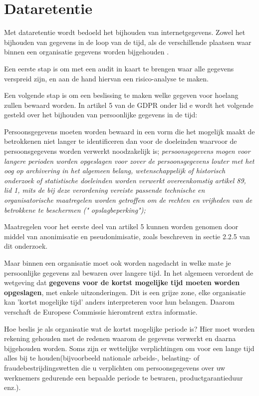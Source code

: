 \section{Dataretentie}
Met dataretentie wordt bedoeld het bijhouden van internetgegevens. Zowel het bijhouden van gegevens in de loop van de tijd, als de verschillende plaatsen waar binnen een organisatie gegevens worden bijgehouden \textcite{Commissie2016}.

Een eerste stap is om met een audit in kaart te brengen waar alle gegevens verspreid zijn, en aan de hand hiervan een risico-analyse te maken. 

Een volgende stap is om een beslissing te maken welke gegeven voor hoelang zullen bewaard worden. 
In artikel 5 van de GDPR onder lid e wordt het volgende gesteld over het bijhouden van persoonlijke gegevens in de tijd:

Persoonsgegevens moeten worden bewaard in een vorm die het mogelijk maakt de betrokkenen niet langer te identificeren dan voor de doeleinden waarvoor de persoonsgegevens worden verwerkt noodzakelijk is; \textit{persoonsgegevens mogen voor langere perioden worden opgeslagen voor zover de persoonsgegevens louter met het oog op archivering in het algemeen belang, wetenschappelijk of historisch onderzoek of statistische doeleinden worden verwerkt overeenkomstig artikel 89, lid 1, mits de bij deze verordening vereiste passende technische en organisatorische maatregelen worden getroffen om de rechten en vrijheden van de betrokkene te beschermen (" opslagbeperking");}

Maatregelen voor het eerste deel van artikel 5 kunnen worden genomen door middel van anonimisatie en pseudonimisatie, zoals beschreven in sectie 2.2.5 van dit onderzoek. 

Maar binnen een organisatie moet ook worden nagedacht in welke mate je persoonlijke gegevens zal bewaren over langere tijd. In het algemeen verordent de wetgeving dat \textbf{gegevens voor de kortst mogelijke tijd moeten worden opgeslagen}, met enkele uitzonderingen. Dit is een grijze zone, elke organisatie kan 'kortst mogelijke tijd' anders interpreteren voor hun belangen. Daarom verschaft de Europese Commissie hieromtrent extra informatie. 

Hoe beslis je als organisatie wat de kortst mogelijke periode is? Hier moet worden rekening gehouden met de redenen waarom de gegevens verwerkt en daarna bijgehouden worden. Soms zijn er wettelijke verplichtingen om voor een lange tijd alles bij te houden(bijvoorbeeld nationale arbeids-, belasting- of fraudebestrijdingswetten die u verplichten om persoonsgegevens over uw werknemers gedurende een bepaalde periode te bewaren, productgarantieduur enz.). \textcite{Commissie2016} 

